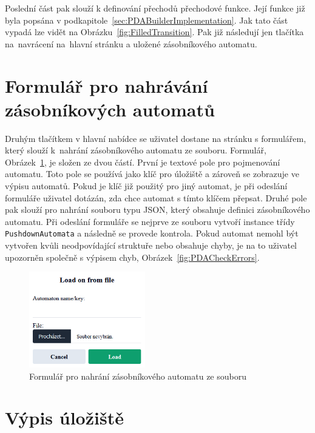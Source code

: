 Poslední část pak slouží k definování přechodů přechodové funkce. Její funkce již byla popsána v podkapitole~\ref{sec:PDABuilderImplementation}. Jak tato část vypadá lze vidět na Obrázku~\ref{fig:FilledTransition}. Pak již následují jen tlačítka na~navrácení na~hlavní stránku a uložené zásobníkového automatu.

\section{Formulář pro nahrávání zásobníkových automatů}\label{sec:UploadForm}

Druhým tlačítkem v hlavní nabídce se uživatel dostane na stránku s formulářem, který slouží k~nahrání zásobníkového automatu ze souboru. Formulář, Obrázek~\ref{fig:UploadForm}, je složen ze dvou částí. První je textové pole pro pojmenování automatu. Toto pole se používá jako klíč pro úložiště a zároveň se zobrazuje ve výpisu automatů. Pokud je klíč již použitý pro jiný automat, je při odeslání formuláře uživatel dotázán, zda chce automat s tímto klíčem přepsat. Druhé pole pak slouží pro nahrání souboru typu JSON, který obsahuje definici zásobníkového automatu. Při odeslání formuláře se nejprve ze souboru vytvoří instance třídy \texttt{PushdownAutomata} a následně se provede kontrola. Pokud automat nemohl být vytvořen kvůli neodpovídající struktuře nebo obsahuje chyby, je na to uživatel upozorněn společně s výpisem chyb, Obrázek~\ref{fig:PDACheckErrors}.

\begin{figure}[h]
    \centering
    \includegraphics[width=0.45\textwidth]{Figures/PrntScrn_UI_Upload.png}
    \caption{Formulář pro nahrání zásobníkového automatu ze souboru}\label{fig:UploadForm}
\end{figure}

\section{Výpis úložiště}\label{sec:StoragePage}

